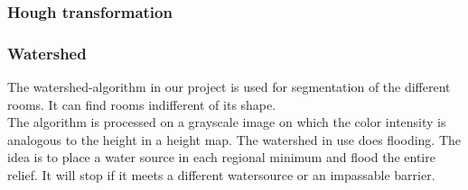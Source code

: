 \subsubsection{Hough transformation}
\subsubsection{Watershed}
The watershed-algorithm in our project is used for segmentation of the different rooms. It can find rooms indifferent of its shape.
\\
The algorithm is processed on a grayscale image on which the color intensity is analogous to the height in a height map. The watershed in use does flooding. The idea is to place a water source in each regional minimum and flood the entire relief. It will stop if it meets a different watersource or an impassable barrier.
